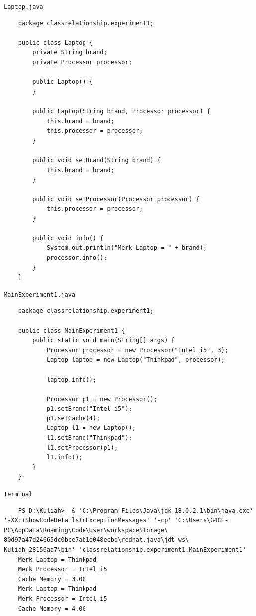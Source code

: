 \documentclass[12pt,titlepage]{article}
\begin{document}
\newpage
\noindent \texttt{Laptop.java}
\begin{verbatim}
    package classrelationship.experiment1;

    public class Laptop {
        private String brand;
        private Processor processor;

        public Laptop() {
        }

        public Laptop(String brand, Processor processor) {
            this.brand = brand;
            this.processor = processor;
        }

        public void setBrand(String brand) {
            this.brand = brand;
        }

        public void setProcessor(Processor processor) {
            this.processor = processor;
        }

        public void info() {
            System.out.println("Merk Laptop = " + brand);
            processor.info();
        }
    }
\end{verbatim}

\newpage
\noindent \texttt{MainExperiment1.java}
\begin{verbatim}
    package classrelationship.experiment1;

    public class MainExperiment1 {
        public static void main(String[] args) {
            Processor processor = new Processor("Intel i5", 3);
            Laptop laptop = new Laptop("Thinkpad", processor);

            laptop.info();

            Processor p1 = new Processor();
            p1.setBrand("Intel i5");
            p1.setCache(4);
            Laptop l1 = new Laptop();
            l1.setBrand("Thinkpad");
            l1.setProcessor(p1);
            l1.info();
        }
    }
\end{verbatim}

\noindent \texttt{Terminal}
\begin{verbatim}
    PS D:\Kuliah>  & 'C:\Program Files\Java\jdk-18.0.2.1\bin\java.exe' '-XX:+ShowCodeDetailsInExceptionMessages' '-cp' 'C:\Users\G4CE-PC\AppData\Roaming\Code\User\workspaceStorage\ 80d97a47d24665dc0bce7ab1e048ecbd\redhat.java\jdt_ws\ Kuliah_28156aa7\bin' 'classrelationship.experiment1.MainExperiment1'
    Merk Laptop = Thinkpad
    Merk Processor = Intel i5
    Cache Memory = 3.00
    Merk Laptop = Thinkpad
    Merk Processor = Intel i5
    Cache Memory = 4.00
\end{verbatim}
\end{document}
